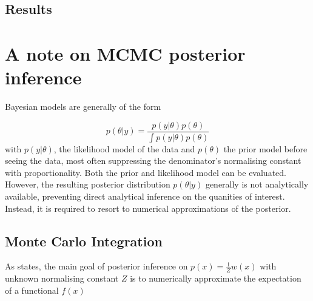 \documentclass[11pt]{article}
\begin{document}
%
        \subsection{Results}


    \section{A note on MCMC posterior inference} \label{inference}
        Bayesian models are generally of the form

        \begin{equation}
            p(\theta|y) = \frac{p(y|\theta)p(\theta)}{\int p(y|\theta)p(\theta)}
        \end{equation}
        with $p(y|\theta)$, the likelihood model of the data and $p(\theta)$ the prior model before seeing the data, most often suppressing the denominator's normalising constant with proportionality. Both the prior and likelihood model can be evaluated. However, the resulting posterior distribution $p(\theta|y)$ generally is not analytically available, preventing direct analytical inference on the quanities of interest. Instead, it is required to resort to numerical approximations of the posterior.

        \subsection{Monte Carlo Integration}
        As \citep{mackay2003information} states, the main goal of posterior inference on $p(x)= \frac{1}{Z} w(x)$ with unknown normalising constant $Z$ is to numerically approximate the expectation of a functional $f(x)$
\end{document}
